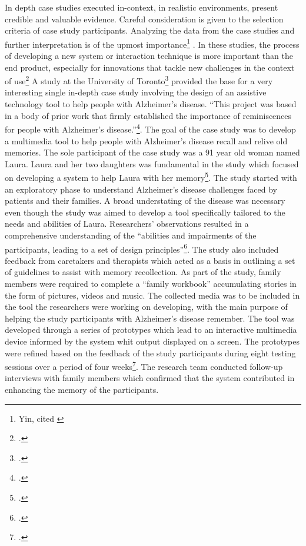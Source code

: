 In depth case studies executed in-context, in realistic environments, present credible and valuable evidence.  Careful consideration is given to the selection criteria of case study participants. Analyzing the data from the case studies and further interpretation is of the upmost importance\footnote{Yin, cited \cite{Lazar2010}} .
In these studies, the process of developing a new system or interaction technique is more important than the end product, especially for innovations that tackle new challenges in the context of use\footcite{Cohene2007} 
A study at the University of Toronto\footcite{Cohene2007} provided the base for a very interesting single in-depth case study involving the design of an assistive technology tool to help people with Alzheimer’s disease. “This project was based in a body of prior work that firmly established the importance of reminiscences for people with Alzheimer’s disease.”\footcite{Cohene2007}. The goal of the case study was to develop a multimedia tool to help people with Alzheimer’s disease recall and relive old memories. The sole participant of the case study was a 91 year old woman named Laura. Laura and her two daughters was fundamental in the study which focused on developing a system to help Laura with her memory\footcite{Cohene2007}. 
The study started with an exploratory phase to understand Alzheimer’s disease challenges faced by patients and their families. A broad understating of the disease was necessary even though the study was aimed to develop a tool specifically tailored to the needs and abilities of Laura.  Researchers’ observations resulted in a comprehensive understanding of the “abilities and impairments of the participants, leading to a set of design principles”\footcite{Cohene2007}. The study also included feedback from caretakers and therapists which acted as a basis in outlining a set of guidelines to assist with memory recollection. As part of the study, family members were required to complete a “family workbook” accumulating stories in the form of pictures, videos and music.  The collected media was to be included in the tool the researchers were working on developing, with the main purpose of helping the study participants with Alzheimer’s disease remember.   
The tool was developed through a series of prototypes which lead to an interactive multimedia device informed by the system whit output displayed on a screen.  The prototypes were refined based on the feedback of the study participants during eight testing sessions over a period of four weeks\footcite{Cohene2007}. 
The research team conducted follow-up interviews with family members which confirmed that the system contributed in enhancing the memory of the participants. 
